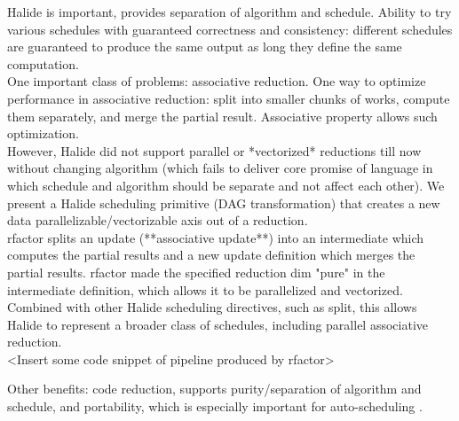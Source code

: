 Halide \cite{Ragan-Kelley:2013:HLC:2491956.2462176} is important, provides separation of algorithm and schedule. Ability to try various schedules with guaranteed correctness and consistency: different schedules are guaranteed to produce the same output as long they define the same computation. \\

One important class of problems: associative reduction. One way to optimize performance in associative reduction: split into smaller chunks of works, compute them separately, and merge the partial result. Associative property allows such optimization. \\

However, Halide did not support parallel or *vectorized* reductions till now without changing algorithm (which fails to deliver core promise of language in which schedule and algorithm should be separate and not affect each other). We present a Halide scheduling primitive (DAG transformation) that creates a new data parallelizable/vectorizable axis out of a reduction. \\

rfactor splits an update (**associative update**) into an intermediate which computes the partial results and a new update definition which merges the partial results. rfactor made the specified reduction dim "pure" in the intermediate definition, which allows it to be parallelized and vectorized. Combined with other Halide scheduling directives, such as split, this allows Halide to represent a broader class of schedules, including parallel associative reduction. \\

<Insert some code snippet of pipeline produced by rfactor>

Other benefits: code reduction, supports purity/separation of algorithm and schedule, and portability, which is especially important for auto-scheduling \cite{Mullapudi:2016:ASH:2897824.2925952}. \\
